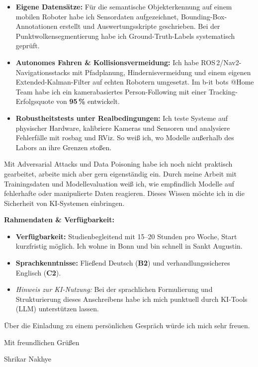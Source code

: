 \documentclass[a4paper,10pt]{article}
\begin{document}
\begin{minipage}{0.97\textwidth}
\begin{itemize}[leftmargin=*, itemsep=2.5pt, topsep=2pt]
    \item \textbf{Eigene Datensätze:} Für die semantische Objekterkennung auf einem mobilen Roboter habe ich Sensordaten aufgezeichnet, Bounding-Box-Annotationen erstellt und Auswertungsskripte geschrieben. Bei der Punktwolkensegmentierung habe ich Ground-Truth-Labels systematisch geprüft.

    \item \textbf{Autonomes Fahren \& Kollisionsvermeidung:} Ich habe ROS\,2/Nav2-Navigationsstacks mit Pfadplanung, Hindernisvermeidung und einem eigenen Extended-Kalman-Filter auf echten Robotern umgesetzt. Im b-it bots @Home Team habe ich ein kamerabasiertes Person-Following mit einer Tracking-Erfolgsquote von \textbf{95\,\%} entwickelt.

    \item \textbf{Robustheitstests unter Realbedingungen:} Ich teste Systeme auf physischer Hardware, kalibriere Kameras und Sensoren und analysiere Fehlerfälle mit rosbag und RViz. So weiß ich, wo Modelle außerhalb des Labors an ihre Grenzen stoßen.

\end{itemize}

\vspace{3pt}

Mit Adversarial Attacks und Data Poisoning habe ich noch nicht praktisch gearbeitet, arbeite mich aber gern eigenständig ein. Durch meine Arbeit mit Trainingsdaten und Modellevaluation weiß ich, wie empfindlich Modelle auf fehlerhafte oder manipulierte Daten reagieren. Dieses Wissen möchte ich in die Sicherheit von KI-Systemen einbringen.

\vspace{3pt}

\textbf{Rahmendaten \& Verfügbarkeit:}
\begin{itemize}[leftmargin=*, itemsep=1.5pt, topsep=1pt]
    \item \textbf{Verfügbarkeit:} Studienbegleitend mit 15--20 Stunden pro Woche, Start kurzfristig möglich. Ich wohne in Bonn und bin schnell in Sankt Augustin.
    \item \textbf{Sprachkenntnisse:} Fließend Deutsch (\textbf{B2}) und verhandlungssicheres Englisch (\textbf{C2}).
    \item \textit{Hinweis zur KI-Nutzung:} Bei der sprachlichen Formulierung und Strukturierung dieses Anschreibens habe ich mich punktuell durch KI-Tools (LLM) unterstützen lassen.
\end{itemize}

\vspace{3pt}

Über die Einladung zu einem persönlichen Gespräch würde ich mich sehr freuen.

\vspace{8pt}

Mit freundlichen Grüßen

\vspace{6pt}
Shrikar Nakhye

\end{minipage}
\end{document}
